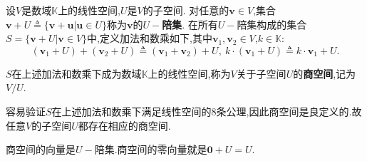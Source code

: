 \documentclass[../../main.tex]{subfiles}%
\begin{document}
\begin{definition}[$U-$陪集与商空间]\label{definition:U-陪集与商空间}
设\(V\)是数域\(\mathbb{K}\)上的线性空间,\(U\)是\(V\)的子空间. 对任意的\(\boldsymbol{v}\in V\),集合\(\boldsymbol{v}+U\triangleq \{\boldsymbol{v}+\boldsymbol{u}|\boldsymbol{u}\in U\}\)称为\(\boldsymbol{v}\)的\textbf{\(U -\)陪集}. 在所有\(U -\)陪集构成的集合\(S = \{\boldsymbol{v}+U|\boldsymbol{v}\in V\}\)中,定义加法和数乘如下,其中\(\boldsymbol{v}_1,\boldsymbol{v}_2\in V\),\(k\in\mathbb{K}\):
\[
(\boldsymbol{v}_1 + U)+(\boldsymbol{v}_2 + U)\triangleq (\boldsymbol{v}_1+\boldsymbol{v}_2)+U,\ k\cdot(\boldsymbol{v}_1 + U)\triangleq k\cdot\boldsymbol{v}_1+U.
\]

\(S\)在上述加法和数乘下成为数域\(\mathbb{K}\)上的线性空间,称为\(V\)关于子空间\(U\)的\textbf{商空间},记为\(V/U\).
\end{definition}
\begin{note}
容易验证\(S\)在上述加法和数乘下满足线性空间的8条公理,因此商空间是良定义的.故任意$V$的子空间$U$都存在相应的商空间.
\end{note}
\begin{remark}
商空间的向量是$U-$陪集.商空间的零向量就是$\boldsymbol{0} + U=U$.
\end{remark}
\end{document}
